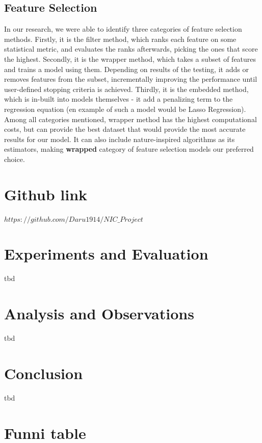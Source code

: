 \documentclass[conference]{IEEEtran}
\begin{document}
\subsection{Feature Selection}

In our research, we were able to identify three categories of feature selection methods. Firstly, it is the filter method, which ranks each feature on some statistical metric, and evaluates the ranks afterwards, picking the ones that score the highest. Secondly, it is the wrapper method, which takes a subset of features and trains a model using them. Depending on results of the testing, it adds or removes features from the subset, incrementally improving the performance until user-defined stopping criteria is achieved. Thirdly, it is the embedded method, which is in-built into models themselves - it add a penalizing term to the regression equation (en example of such a model would be Lasso Regression).\\

Among all categories mentioned, wrapper method has the highest computational costs, but can provide the best dataset that would provide the most accurate results for our model. It can also include nature-inspired algorithms as its estimators, making \textbf{wrapped} category of feature selection models our preferred choice. 

\section{Github link}
$https://github.com/Daru1914/NIC\_Project$

\section{Experiments and Evaluation}
tbd

\section{Analysis and Observations}
tbd

\section{Conclusion}
tbd




\section{Funni table}
\end{document}
